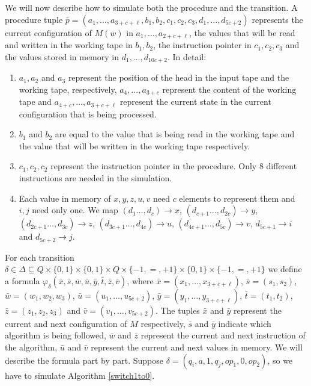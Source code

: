 We will now describe how to simulate both the procedure and the transition. A procedure tuple $\bar{p} = (a_1,\ldots,a_{3+c+\ell},b_1,b_2,c_1,c_2,c_3,d_1,\ldots,d_{5c+2})$ represents the current configuration of $M(w)$ in $a_1,\ldots,a_{2+c+\ell}$, the values that will be read and written in the working tape in $b_1,b_2$, the instruction pointer in $c_1,c_2,c_3$ and the values stored in memory in $d_1,\ldots,d_{10c+2}$. In detail:
\begin{enumerate}
	\item $a_1,a_2$ and $a_3$ represent the position of the head in the input tape and the working tape, respectively, $a_4,\ldots,a_{3+c}$ represent the content of the working tape and $a_{4+c},\ldots,a_{3+c+\ell}$ represent the current state in the current configuration that is being processed.
	\item $b_1$ and $b_2$ are equal to the value that is being read in the working tape and the value that will be written in the working tape respectively.
	\item $c_1,c_2,c_2$ represent the instruction pointer in the procedure. Only 8 different instructions are needed in the simulation.
	\item Each value in memory of $x,y,z,u,v$ need $c$ elements to represent them and $i,j$ need only one. We map $(d_1\ldots,d_{c}) \to x$, $(d_{c+1}\ldots,d_{2c}) \to y$,
	$(d_{2c+1}\ldots,d_{3c}) \to z$, $(d_{3c+1}\ldots,d_{4c}) \to u$,
	$(d_{4c+1}\ldots,d_{5c}) \to v$, $d_{5c+1} \to i$ and $d_{5c+2}\to j$.
\end{enumerate}
For each transition $\delta \in \Delta \subseteq Q \times \{0,1\} \times \{0,1\} \times Q \times \{-1,=,+1\} \times \{0,1\} \times \{-1,=,+1\}$ we define a formula $\varphi_{\delta}(\bar{x},\bar{s},\bar{w},\bar{u},\bar{y},\bar{t},\bar{z},\bar{v})$, where $\bar{x} = (x_1,\ldots,x_{3+c+\ell})$, $\bar{s} = (s_1,s_2)$, $\bar{w} = (w_1,w_2,w_3)$, $\bar{u} = (u_1,\ldots,u_{5c+2})$, $\bar{y} = (y_1,\ldots,y_{3+c+\ell})$, $\bar{t} = (t_1,t_2)$, $\bar{z} = (z_1,z_2,z_3)$ and $\bar{v} = (v_1,\ldots,v_{5c+2})$. The tuples $\bar{x}$ and $\bar{y}$ represent the current and next configuration of $M$ respectively, $\bar{s}$ and $\bar{y}$ indicate which algorithm is being followed, $\bar{w}$ and $\bar{z}$ represent the current and next instruction of the algorithm, $\bar{u}$ and $\bar{v}$ represent the current and next values in memory. We will describe the formula part by part. Suppose $\delta = (q_i,a,1,q_j,op_1,0,op_2)$, so we have to simulate Algorithm \ref{switch1to0}.


